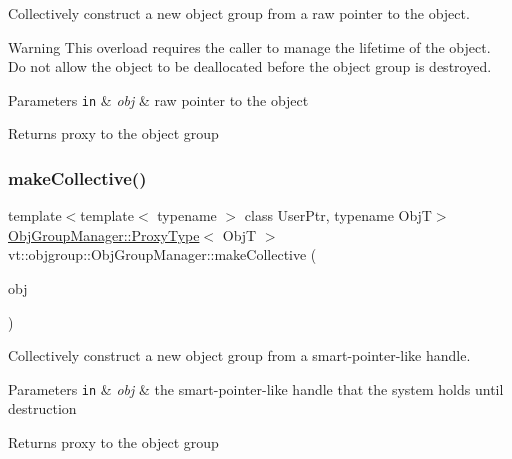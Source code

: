 Collectively construct a new object group from a raw pointer to the object. 

\begin{DoxyWarning}{Warning}
This overload requires the caller to manage the lifetime of the object. Do not allow the object to be deallocated before the object group is destroyed.
\end{DoxyWarning}

\begin{DoxyParams}[1]{Parameters}
\mbox{\tt in}  & {\em obj} & raw pointer to the object\\
\hline
\end{DoxyParams}
\begin{DoxyReturn}{Returns}
proxy to the object group 
\end{DoxyReturn}
\mbox{\label{structvt_1_1objgroup_1_1_obj_group_manager_affb52495aa20a14b485ad3ba48234718}} 
\subsubsection{\texorpdfstring{make\+Collective()}{makeCollective()}\hspace{0.1cm}{\footnotesize\ttfamily [5/5]}}
{\footnotesize\ttfamily template$<$template$<$ typename $>$ class User\+Ptr, typename ObjT$>$ \\
\hyperlink{structvt_1_1objgroup_1_1_obj_group_manager_aea65eef52f240a52210132eef5ce591f}{Obj\+Group\+Manager\+::\+Proxy\+Type}$<$ ObjT $>$ vt\+::objgroup\+::\+Obj\+Group\+Manager\+::make\+Collective (\begin{DoxyParamCaption}\item[{User\+Ptr$<$ ObjT $>$}]{obj }\end{DoxyParamCaption})}



Collectively construct a new object group from a smart-\/pointer-\/like handle. 


\begin{DoxyParams}[1]{Parameters}
\mbox{\tt in}  & {\em obj} & the smart-\/pointer-\/like handle that the system holds until destruction\\
\hline
\end{DoxyParams}
\begin{DoxyReturn}{Returns}
proxy to the object group 
\end{DoxyReturn}
\mbox{\label{structvt_1_1objgroup_1_1_obj_group_manager_ab9885f22f148479bb68f3a59a147cdec}} 
